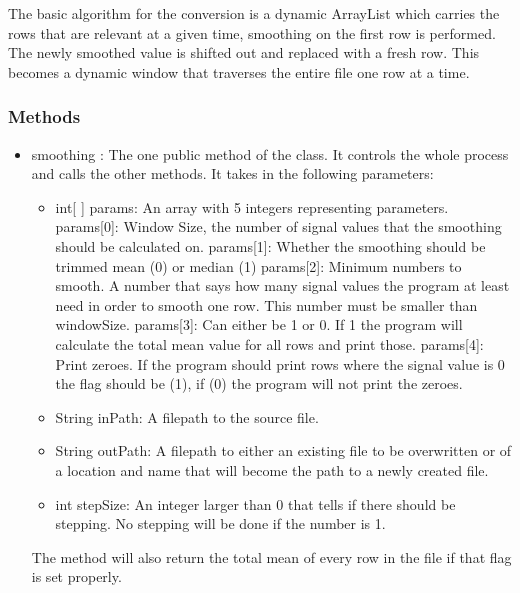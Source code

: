 
The basic algorithm for the conversion is a dynamic ArrayList which carries the rows that are relevant at a given time, smoothing on the first row is performed. The newly smoothed value is shifted out and replaced with a fresh row. This becomes a dynamic window that traverses the entire file one row at a time.

\subsubsection{Methods}

\begin{itemize} 
\item smoothing : The one public method of the class. It controls the whole process and calls the other methods. It takes in the following parameters:
\begin{itemize}
\item int[ ] params: An array with 5 integers representing parameters.
     params[0]: Window Size, the number of signal values that the smoothing
      		  should be calculated on. \newline
      params[1]: Whether the smoothing should be trimmed mean (0) or median (1)\newline
      params[2]: Minimum numbers to smooth. A number that says how many signal
      		  values the program at least need in order to smooth one row.
      		  This number must be smaller than windowSize. \newline
      params[3]: Can either be 1 or 0. If 1 the program will calculate the
      		  total mean value for all rows and print those. \newline
      params[4]: Print zeroes. If the program should print rows where the
      		  signal value is 0 the flag should be (1), if (0) the program
      		  will not print the zeroes. \newline
\item String inPath: A filepath to the source file.
\item String outPath: A filepath to either an existing file to be overwritten or of a location and name that will become the path to a newly created file.
\item int stepSize:  An integer larger than 0 that tells if there should be stepping. No stepping will be done if the number is 1.
\end{itemize}

The method will also return the total mean of every row in the file if that flag is set properly.


\end{itemize}
